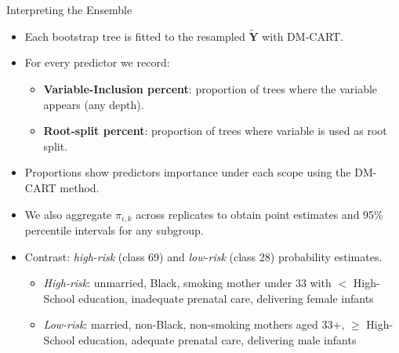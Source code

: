 \documentclass[aspectratio=169,professionalfonts]{beamer}
\begin{document}
\begin{frame}{Interpreting the Ensemble}
\begin{itemize}
  \item Each bootstrap tree is fitted to the resampled \(\tilde{\mathbf Y}\) with DM‑CART.
  \item For every predictor we record:
        \begin{itemize}
          \item \textbf{Variable-Inclusion percent}: proportion of trees where the variable appears (any depth).
          \item \textbf{Root‑split percent}: proportion of trees where variable is used as root split.
        \end{itemize}
  \item Proportions show predictors importance under each scope using the DM-CART method.
  \item We also aggregate \(\hat{\pi}_{i,k}\) across replicates to obtain point estimates and 95\% percentile intervals for any subgroup.
  \item Contrast: \textit{high-risk} (class 69) and \textit{low-risk} (class 28) probability estimates. 
    \begin{itemize}
          \item \textit{High-risk}: unmarried, Black, smoking mother under 33 with $<$ High-School education, inadequate prenatal care, delivering female infants
          \item \textit{Low-risk}: married, non-Black, non-smoking mothers aged 33+, $\geq$ High-School education, adequate prenatal care, delivering male infants
    \end{itemize}
    
\end{itemize}
\end{frame}
\end{document}
